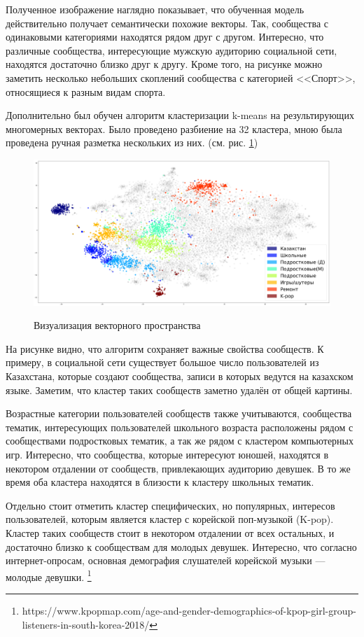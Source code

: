 \documentclass[times,specification,annotation]{itmo-student-thesis}
\begin{document}
Полученное изображение наглядно показывает, что обученная модель действительно получает семантически похожие векторы. Так, сообщества с одинаковыми категориями находятся рядом друг с другом. Интересно, что различные сообщества, интересующие мужскую аудиторию социальной сети, находятся достаточно близко друг к другу. Кроме того, на рисунке можно заметить несколько небольших скоплений сообщества с категорией <<Спорт>>, относящиеся к разным видам спорта.  

Дополнительно был обучен алгоритм кластеризации k-means на результирующих многомерных векторах. Было проведено разбиение на 32 кластера, мною была проведена ручная разметка нескольких из них. (см. рис. \ref{pic:clusters})

\begin{figure}[h]
\caption{Визуализация векторного пространства}
\centering
\includegraphics[width=1\textwidth]{clusters}
\label{pic:clusters}
\end{figure}

На рисунке видно, что алгоритм сохраняет важные свойства сообществ. К примеру, в социальной сети существует большое число пользователей из Казахстана, которые создают сообщества, записи в которых ведутся на казахском языке. Заметим, что кластер таких сообществ заметно удалён от общей картины. 

Возрастные категории пользователей сообществ также учитываются, сообщества тематик, интересующих пользователей школьного возраста расположены рядом с сообществами подростковых тематик, а так же рядом с кластером компьютерных игр. Интересно, что сообщества, которые интересуют юношей, находятся в некотором отдалении от сообществ, привлекающих аудиторию девушек. В то же время оба кластера находятся в близости к кластеру школьных тематик.

Отдельно стоит отметить кластер специфических, но популярных, интересов пользователей, которым является кластер с корейской поп-музыкой (K-pop). Кластер таких сообществ стоит в некотором отдалении от всех остальных, и достаточно близко к сообществам для молодых девушек. Интересно, что согласно интернет-опросам, основная демография слушателей корейской музыки --- молодые девушки. \footnote{https://www.kpopmap.com/age-and-gender-demographics-of-kpop-girl-group-listeners-in-south-korea-2018/}
\end{document}
